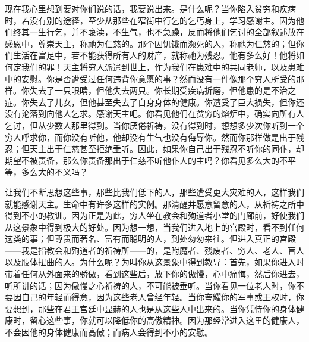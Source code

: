 现在我心里想到要对你们说的话，我要说出来。是什么呢？当你陷入贫穷和疾病时，若没有别的途径，至少从那些在窄街中行乞的乞丐身上，学习感谢主。因为他们终其一生行乞，并不亵渎，不生气，也不急躁，反而将他们乞讨的全部叙述放在感恩中，尊崇天主，称祂为仁慈的。那个因饥饿而濒死的人，称祂为仁慈的；但你们生活在富足中，若不能获得所有人的财产，就称祂为残忍。他有多么好！他将如何定我们的罪！天主将穷人派遣到世上，作为我们在患难中的共同老师，以及患难中的安慰。你是否遭受过任何违背你意愿的事？然而没有一件像那个穷人所受的那样。你失去了一只眼睛，但他失去两只。你长期受疾病折磨，但他患的是不治之症。你失去了儿女，但他甚至失去了自身身体的健康。你遭受了巨大损失，但你还没有沦落到向他人乞求。感谢天主吧。你看见他们在贫穷的熔炉中，确实向所有人乞讨，但从少数人那里得到。当你厌倦祈祷，没有得到时，想想多少次你听到一个穷人呼求你，而你没有听他，他却没有生气也没有侮辱你。然而你那样做是出于残忍；但天主出于仁慈甚至拒绝垂听。因此，如果你自己出于残忍不听你的同仆，却期望不被责备，那么你责备那出于仁慈不听他仆人的主吗？你看见多么大的不平等，多么大的不义吗？\par

让我们不断思想这些事，那些比我们低下的人，那些遭受更大灾难的人，这样我们就能感谢天主。生命中有许多这样的实例。那清醒并愿意留意的人，从祈祷之所中得到不小的教训。因为正是为此，穷人坐在教会和殉道者小堂的门廊前，好使我们从这景象中得到极大的好处。因为想一想，当我们进入地上的宫殿时，看不到任何这类的事；但尊贵而著名、富有而聪明的人，到处匆匆来往。但进入真正的宫殿——我是指教会和殉道者的祈祷所——的，是附魔者、残废者、穷人、老人、盲人以及肢体扭曲的人。为什么呢？为叫你从这景象中得到教导：首先，如果你进入时带着任何从外面来的骄傲，看到这些后，放下你的傲慢，心中痛悔，然后你进去，听所讲的话；因为傲慢之心祈祷的人，不可能被垂听。当你看见一位老人时，你不要因自己的年轻而得意，因为这些老人曾经年轻。当你夸耀你的军事或王权时，你要想到，那些在君王宫廷中显赫的人也是从这些人中出来的。当你凭恃你的身体健康时，留心这些事，你就可以降低你的高傲精神。因为那经常进入这里的健康人，不会因他的身体健康而高傲；而病人会得到不小的安慰。\par

